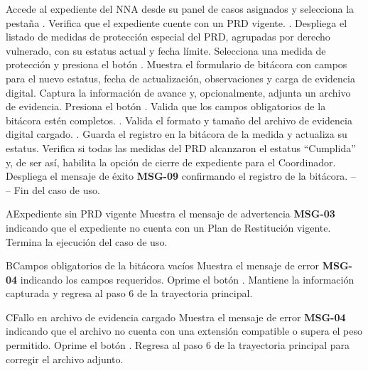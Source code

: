\begin{UCtrayectoria}
	\UCpaso[\UCactor] Accede al expediente del NNA desde su panel de casos asignados y selecciona la pestaña .
	\UCpaso Verifica que el expediente cuente con un PRD vigente. .
	\UCpaso Despliega el listado de medidas de protección especial del PRD, agrupadas por derecho vulnerado, con su estatus actual y fecha límite.
	\UCpaso[\UCactor] Selecciona una medida de protección y presiona el botón .
	\UCpaso Muestra el formulario de bitácora con campos para el nuevo estatus, fecha de actualización, observaciones y carga de evidencia digital.
	\UCpaso[\UCactor] Captura la información de avance y, opcionalmente, adjunta un archivo de evidencia.
	\UCpaso[\UCactor] Presiona el botón .
	\UCpaso Valida que los campos obligatorios de la bitácora estén completos. .
	\UCpaso Valida el formato y tamaño del archivo de evidencia digital cargado. .
	\UCpaso Guarda el registro en la bitácora de la medida y actualiza su estatus.
	\UCpaso Verifica si todas las medidas del PRD alcanzaron el estatus ``Cumplida'' y, de ser así, habilita la opción de cierre de expediente para el Coordinador.
	\UCpaso Despliega el mensaje de éxito {\bf MSG-09} confirmando el registro de la bitácora.
	\UCpaso[] -- -- Fin del caso de uso.
\end{UCtrayectoria}

\begin{UCtrayectoriaA}{A}{Expediente sin PRD vigente}
	\UCpaso Muestra el mensaje de advertencia {\bf MSG-03} indicando que el expediente no cuenta con un Plan de Restitución vigente.
	\UCpaso Termina la ejecución del caso de uso.
\end{UCtrayectoriaA}

\begin{UCtrayectoriaA}{B}{Campos obligatorios de la bitácora vacíos}
	\UCpaso Muestra el mensaje de error {\bf MSG-04} indicando los campos requeridos.
	\UCpaso[\UCactor] Oprime el botón .
	\UCpaso Mantiene la información capturada y regresa al paso 6 de la trayectoria principal.
\end{UCtrayectoriaA}

\begin{UCtrayectoriaA}{C}{Fallo en archivo de evidencia cargado}
	\UCpaso Muestra el mensaje de error {\bf MSG-04} indicando que el archivo no cuenta con una extensión compatible o supera el peso permitido.
	\UCpaso[\UCactor] Oprime el botón .
	\UCpaso Regresa al paso 6 de la trayectoria principal para corregir el archivo adjunto.
\end{UCtrayectoriaA}
